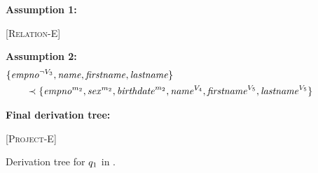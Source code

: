 \begin{figure}
\caption[Example of derivation tree to determine the type of a query]{Derivation tree for \ensuremath{\vQ_1} in .}

\scriptsize

\textbf{Assumption 1:}
\begin{prooftree*}
 [\textsc{Relation-E}] {\env [\fModel_2] [\vSch_2] {\empbio} {\annot [\fModel_2] {(\empno, \sex, \birthdate, \annot [\vFour] \name, \annot [\vFive] \fname, \annot [\vFive] \lname)}}}
\end{prooftree*}

\medskip
\textbf{Assumption 2:}
\begin{alignat*}{1}
&  { \{\annot [\neg \vThree] \empno, \name, \fname, \lname  \} }\\ 
&\qquad \prec
{\{\annot [\fModel_2] \empno, \annot [\fModel_2] \sex, \annot [\fModel_2] \birthdate, \annot [\vFour] \name, \annot [\vFive] \fname, \annot [\vFive] \lname\} } 
\end{alignat*}

\medskip
\textbf{Final derivation tree:}
\begin{prooftree*}
 [\textsc{Project-E}] { {\annot [\fModel_2] {( \annot [(\neg \vThree) \wedge \fModel_2] \empno, \annot [\vFour] \name, \annot [\vFive] \fname, \annot [\vFive] \lname)} }}
\end{prooftree*}
\end{figure}

